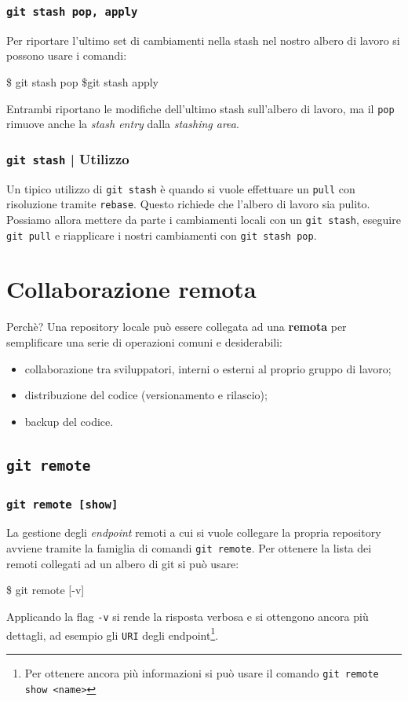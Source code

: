 \documentclass{beamer}
\begin{document}
\begin{frame}
  \frametitle{\texttt{git stash pop, apply}}
  Per riportare l'ultimo set di cambiamenti nella stash nel nostro albero di
  lavoro si possono usare i comandi:
  \begin{semiverbatim}
  \$ git stash pop  \$git stash apply
  \end{semiverbatim}
  Entrambi riportano le modifiche dell'ultimo stash sull'albero di lavoro, ma il
  \texttt{pop} rimuove anche la \emph{stash entry} dalla \emph{stashing area}.
\end{frame}

\begin{frame}
  \frametitle{\texttt{git stash} | Utilizzo}
  Un tipico utilizzo di \texttt{git stash} \`e quando si vuole effettuare un
  \texttt{pull} con risoluzione tramite \texttt{rebase}. Questo richiede che
  l'albero di lavoro sia pulito. Possiamo allora mettere da parte i cambiamenti
  locali con un \texttt{git stash}, eseguire \texttt{git pull} e riapplicare i
  nostri cambiamenti con \texttt{git stash pop}.
\end{frame}

\section{Collaborazione remota}
\begin{frame}{Perch\`e?}
  Una repository locale pu\`o essere collegata ad una \textbf{remota} per
  semplificare una serie di operazioni comuni e desiderabili:
  \begin{itemize}
    \item<1-> collaborazione tra sviluppatori, interni o esterni al proprio gruppo di lavoro;
    \item<2-> distribuzione del codice (versionamento e rilascio);
    \item<3-> backup del codice.
  \end{itemize}
\end{frame}

\subsection{\texttt{git remote}}
\begin{frame}
  \frametitle{\texttt{git remote [show]}}
  La gestione degli \emph{endpoint} remoti a cui si vuole collegare la propria
  repository avviene tramite la famiglia di comandi \texttt{git remote}.
  Per ottenere la lista dei remoti collegati ad un albero di git si pu\`o usare:
  \begin{semiverbatim}
  \$ git remote [-v]
  \end{semiverbatim}
  Applicando la flag \texttt{-v} si rende la risposta verbosa e si ottengono
  ancora pi\`u dettagli, ad esempio gli \texttt{URI} degli endpoint\footnote{
    Per ottenere ancora pi\`u informazioni si pu\`o usare il comando \texttt{git remote show <name>}
  }.
\end{frame}
\end{document}
